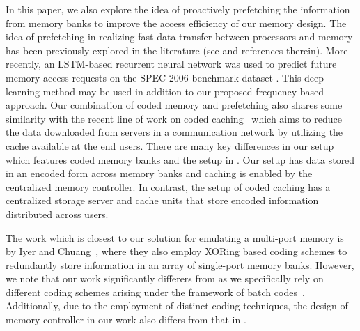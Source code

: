 In this paper, we also explore the idea of proactively prefetching the information from memory banks to improve the access efficiency of our memory design. The idea of prefetching in realizing fast data transfer between processors and memory has been previously explored in the literature (see \cite{Kim2016, Kadjo2014, Shevgoor2015, JL2013} and references therein). 
More recently, an LSTM-based recurrent neural network was used to predict future memory access requests on the SPEC 2006 benchmark dataset \cite{lstm2018}. This deep learning method may be used in addition to our proposed frequency-based approach.
Our combination of coded memory and prefetching also shares some similarity with the recent line of work on coded caching~\cite{MN16a} which aims to reduce the data downloaded from servers in a communication network by utilizing the cache available at the end users. There are many key differences in our setup which features coded memory banks and the setup in \cite{MN16a}. Our setup has data stored in an encoded form across memory banks and caching is enabled by the centralized memory controller. In contrast, the setup of coded caching has a centralized storage server and cache units that store encoded information distributed across users.

The work which is closest to our solution for emulating a multi-port memory is by Iyer and Chuang~\cite{Memoir_xor, Memoir_xor_virtual}, where they also employ XORing based coding schemes to redundantly store information in an array of single-port memory banks. However, we note that our work significantly differers from \cite{Memoir_xor, Memoir_xor_virtual} as we specifically rely on different coding schemes arising under the framework of batch codes~\cite{batchcodes}. Additionally, due to the employment of distinct coding techniques, the design of memory controller in our work also differs from that in \cite{Memoir_xor, Memoir_xor_virtual}.


